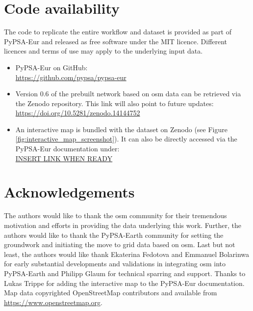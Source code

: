 \documentclass[fleqn,10pt]{wlscirep}
\let\autocite\cite
\begin{document}
\section*{Code availability}
The code to replicate the entire workflow and dataset is provided as part of PyPSA-Eur and released as free software under the MIT licence. Different licences and terms of use may apply to the underlying input data.
\begin{itemize}
    \item PyPSA-Eur \autocite{horschPyPSAEurOpenOptimisation2018} on GitHub: \\ \href{https://github.com/pypsa/pypsa-eur}{https://github.com/pypsa/pypsa-eur}
    \item Version 0.6 of the prebuilt network\autocite{xiongPrebuiltElectricityNetwork2024} based on \acrshort{osm} data can be retrieved via the Zenodo repository. This link will also point to future updates: \\ \href{https://doi.org/10.5281/zenodo.14144752}{https://doi.org/10.5281/zenodo.14144752}
    \item An interactive map is bundled with the dataset on Zenodo (see Figure \ref{fig:interactive_map_screenshot}). It can also be directly accessed via the PyPSA-Eur documentation under: \\
    \href{https://google.com}{INSERT LINK WHEN READY}
\end{itemize}



\section*{Acknowledgements} %
The authors would like to thank the \gls{osm} community for their tremendous motivation and efforts in providing the data underlying this work. Further, the authors would like to thank the PyPSA-Earth community for setting the groundwork and initiating the move to grid data based on \gls{osm}. Last but not least, the authors would like thank Ekaterina Fedotova and Emmanuel Bolarinwa for early substantial developments and validations in integrating \acrshort{osm} into PyPSA-Earth and Philipp Glaum for technical sparring and support. Thanks to Lukas Trippe for adding the interactive map to the PyPSA-Eur documentation. Map data copyrighted OpenStreetMap contributors and available from \href{https://www.openstreetmap.org}{https://www.openstreetmap.org}. 
\end{document}
